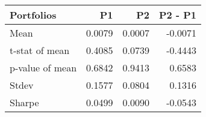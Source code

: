 \begin{tabular}{lrrr}
\toprule
Portfolios & P1 & P2 & P2 - P1 \\
\midrule
Mean & 0.0079 & 0.0007 & -0.0071 \\
t-stat of mean & 0.4085 & 0.0739 & -0.4443 \\
p-value of mean & 0.6842 & 0.9413 & 0.6583 \\
Stdev & 0.1577 & 0.0804 & 0.1316 \\
Sharpe & 0.0499 & 0.0090 & -0.0543 \\
\bottomrule
\end{tabular}
